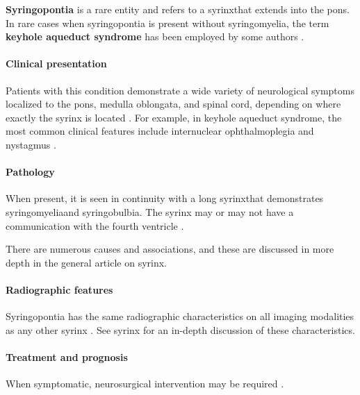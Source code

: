 \textbf{Syringopontia} is a rare entity and refers to a syrinxthat extends into the pons. In rare cases when syringopontia is present without syringomyelia, the term \textbf{keyhole aqueduct syndrome} has been employed by some authors .

\paragraph{Clinical presentation}

Patients with this condition demonstrate a wide variety of neurological symptoms localized to the pons, medulla oblongata, and spinal cord, depending on where exactly the syrinx is located . For example, in keyhole aqueduct syndrome, the most common clinical features include internuclear ophthalmoplegia and nystagmus .


\paragraph{Pathology}

When present, it is seen in continuity with a long syrinxthat demonstrates syringomyeliaand syringobulbia. The syrinx may or may not have a communication with the fourth ventricle .

There are numerous causes and associations, and these are discussed in more depth in the general article on syrinx.


\paragraph{Radiographic features}

Syringopontia has the same radiographic characteristics on all imaging modalities as any other syrinx . See syrinx for an in-depth discussion of these characteristics.


\paragraph{Treatment and prognosis}

When symptomatic, neurosurgical intervention may be required .